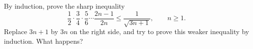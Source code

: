 By induction, prove the sharp inequality
\[ \frac{1}{2} \cdot \frac{3}{4} \cdot \frac{5}{6} \cdots \frac{2n - 1}{2n} \leq \frac{1}{\sqrt{3n + 1}},\qquad n \geq 1. \]
Replace $3n + 1$ by $3n$ on the right side, and try to prove this weaker inequality by induction. What happens?

